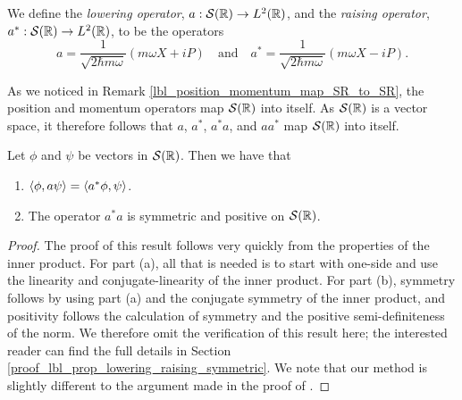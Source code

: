  \begin{definition}
   We define the {\emph{lowering operator}}, $a: \mathcal{S}(\mathbb{R}) \to L^2(\mathbb{R})$, and the {\emph{raising operator}}, $a^*: \mathcal{S}(\mathbb{R}) \to L^2(\mathbb{R})$, to be the operators
   \begin{equation*}
     a = \frac{1}{\sqrt{2\hbar m \omega}} \left( m \omega X + iP \right)
     \quad \text{and} \quad
     a^* = \frac{1}{\sqrt{2\hbar m \omega}} \left( m \omega X - iP \right).
   \end{equation*}
\end{definition}
\begin{remark}\label{lbl_remark_lowering_raising_maps_schwartz_space_to_itself}
  As we noticed in Remark \eqref{lbl_position_momentum_map_SR_to_SR}, the position and momentum operators map $\mathcal{S}(\mathbb{R})$ into itself. As $\mathcal{S}(\mathbb{R})$ is a vector space, it therefore follows that $a$, $a^*$, $a^*a$, and $aa^*$ map $\mathcal{S}(\mathbb{R})$ into itself.
\end{remark}

\begin{proposition}\label{lbl_prop_lowering_raising_symmetric}
  Let $\phi$ and $\psi$ be vectors in $\mathcal{S}(\mathbb{R})$. Then we have that
  \begin{enumerate}[label=(\alph*)]
    \item $\left\langle \phi, a\psi\right\rangle = \left\langle a^* \phi, \psi\right\rangle$.
    \item The operator $a^*a$ is symmetric and positive on $\mathcal{S}(\mathbb{R})$.
  \end{enumerate}
\end{proposition}
\begin{proof}
  The proof of this result follows very quickly from the properties of the inner product. For part (a), all that is needed is to start with one-side and use the linearity and conjugate-linearity of the inner product. For part (b), symmetry follows by using part (a) and the conjugate symmetry of the inner product, and positivity follows the calculation of symmetry and the positive semi-definiteness of the norm.  We therefore omit the verification of this result here; the interested reader can find the full details in Section \eqref{proof_lbl_prop_lowering_raising_symmetric}. We note that our method is slightly different to the argument made in the proof of {\cite[Theorem 11.4]{Hall2013}}.
\end{proof}


